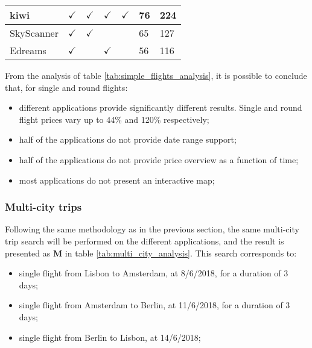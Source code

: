 \begin{table}[h]
\begin{tabular}{|l|l|l|l|l|l|l|}
  kiwi                & $\checkmark$        & $\checkmark$ & $\checkmark$ & $\checkmark$ & 76                         & 224                         \\ \hline
  SkyScanner          & $\checkmark$              & $\checkmark$ &            &            & 65                         & 127                         \\ \hline
  Edreams             & $\checkmark$              &            & $\checkmark$ &            & \cellcolor[HTML]{C0C0C0}56 & 116                         \\ \hline
  \end{tabular}
\end{table}

From the analysis of table \ref{tab:simple_flights_analysis}, it is possible to conclude that, for single and round flights:

\begin{itemize}
  \item different applications provide significantly different results. Single and round flight prices vary up to 44\% and 120\% respectively;
  \item half of the applications do not provide date range support;
  \item half of the applications do not provide price overview as a function of time;
  \item most applications do not present an interactive map;
\end{itemize}




\subsubsection*{Multi-city trips}


Following the same methodology as in the previous section, the same multi-city trip search will be performed 
on the different applications, and the result is presented as \textbf{M} in table \ref{tab:multi_city_analysis}. This search corresponds to:

\begin{itemize}
  \item single flight from Lisbon to Amsterdam, at 8/6/2018, for a duration of 3 days;
  \item single flight from Amsterdam to Berlin, at 11/6/2018, for a duration of 3 days;
  \item single flight from Berlin to Lisbon, at 14/6/2018;
\end{itemize}

